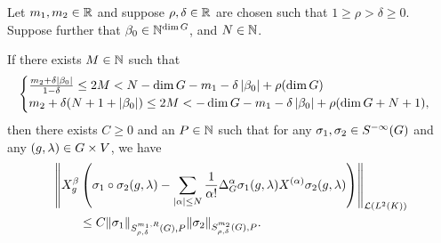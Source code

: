 \begin{lemma}
\label{lemma:prepare_composition_formula}
    Let $m_1, m_2 \in \mathbb{R}$ and suppose $\rho, \delta \in \mathbb{R}$ are chosen such that $1 \geq \rho > \delta \geq 0$.
    Suppose further that $\beta_0 \in \mathbb{N}^{\dim G}$, and $N \in \mathbb{N}$.

    If there exists $M \in \mathbb{N}$ such that
    \begin{align}
        \begin{cases}
            \frac {m_2 + \delta \left|{\beta_{0}}\right|} {1 - \delta} \leq 2 M
            < N - \dim G - m_1 - \delta \left|{\beta_0}\right| + \rho (\dim G)\\
            m_2 + \delta(N + 1 + \left|{\beta_0}\right|)
            \leq 2M <
            -\dim G - m_1 - \delta \left|{\beta_0}\right| + \rho (\dim G + N + 1),
        \end{cases}
        \label{eq:composition_formula:conditions_on_M}
    \end{align}
    then there exists $C \geq 0$ and an $P \in \mathbb{N}$ such that
    for any $\sigma_1, \sigma_2 \in {S^{-\infty} (G)}$ and any $(g, \lambda) \in G \times V$,
    we have
    \begin{align*}
        &\norm [\Lin {\Lebesgue 2 \CompactGroup}] {%
            \LeftDifferentialOperator [g] \beta \left(
                \sigma_1 \circ \sigma_2(g, \lambda)
                - \sum_{\abs \alpha \leq N} \frac 1 {\alpha !} \DifferenceOperatorOrder \alpha \sigma_1(g, \lambda) \TaylorLeftDifferentialOperator \alpha \sigma_2(g, \lambda)
            \right)
        }\\
        &\qquad \leq C \SymbolSemiNorm {m_1, R} {\rho, \delta} P {\sigma_1} \SymbolSemiNorm {m_2} {\rho, \delta} P {\sigma_2}.
    \end{align*}
\end{lemma}
